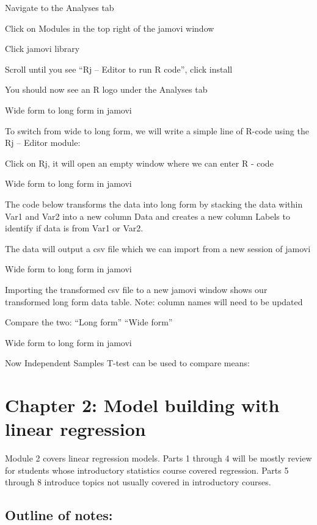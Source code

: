 \documentclass[
  letterpaper,
  DIV=11,
  numbers=noendperiod]{scrreprt}
\begin{document}
Navigate to the Analyses tab

Click on Modules in the top right of the jamovi window

Click jamovi library

Scroll until you see ``Rj -- Editor to run R code'', click install

You should now see an R logo under the Analyses tab

Wide form to long form in jamovi

To switch from wide to long form, we will write a simple line of R-code
using the Rj -- Editor module:

Click on Rj, it will open an empty window where we can enter R - code

Wide form to long form in jamovi

The code below transforms the data into long form by stacking the data
within Var1 and Var2 into a new column Data and creates a new column
Labels to identify if data is from Var1 or Var2.

The data will output a csv file which we can import from a new session
of jamovi

Wide form to long form in jamovi

Importing the transformed csv file to a new jamovi window shows our
transformed long form data table. Note: column names will need to be
updated

Compare the two: ``Long form'' ``Wide form''

Wide form to long form in jamovi

Now Independent Samples T-test can be used to compare means:


\hypertarget{chapter-2-model-building-with-linear-regression}{%
\chapter{Chapter 2: Model building with linear
regression}\label{chapter-2-model-building-with-linear-regression}}

Module 2 covers linear regression models. Parts 1 through 4 will be
mostly review for students whose introductory statistics course covered
regression. Parts 5 through 8 introduce topics not usually covered in
introductory courses.

\hypertarget{outline-of-notes}{%
\section{Outline of notes:}\label{outline-of-notes}}
\end{document}
